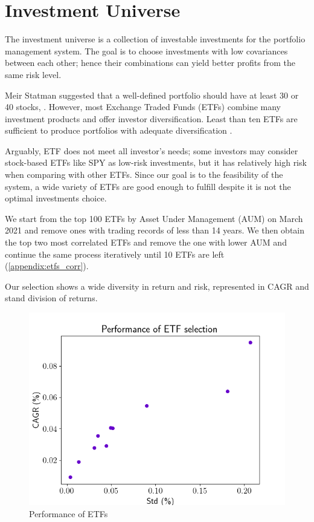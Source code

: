 \section{Investment Universe}
The investment universe is a collection of investable investments for the portfolio management system. The goal is to choose investments with low covariances between each other; hence their combinations can yield better profits from the same risk level\cite{willenbrock2011diversification}. 
\par 
Meir Statman suggested that a well-defined portfolio should have at least 30 or 40 stocks,  \cite{statman1987many}. However, most Exchange Traded Funds (ETFs) combine many investment products and offer investor diversification. Least than ten ETFs are sufficient to produce portfolios with adequate diversification \cite{chang_2016}.
\par
Arguably, ETF does not meet all investor's needs; some investors may consider stock-based ETFs like SPY as low-risk investments, but it has relatively high risk when comparing with other ETFs.
Since our goal is to the feasibility of the system, a wide variety of ETFs are good enough to fulfill despite it is not the optimal investments choice.
\par
We start from the top 100 ETFs by Asset Under Management (AUM) on March 2021 and remove ones with trading records of less than 14 years. We then obtain the top two most correlated ETFs and remove the one with lower AUM and continue the same process iteratively until 10 ETFs are left (\autoref{appendix:etfs_corr}).
\par
Our selection shows a wide diversity in return and risk, represented in CAGR and stand division of returns. 
\begin{figure}[bth]
    \centering
    \includegraphics[width=12cm]{images/etfs.png}
    \caption{Performance of ETFs}
    \label{fig:efts}
\end{figure}